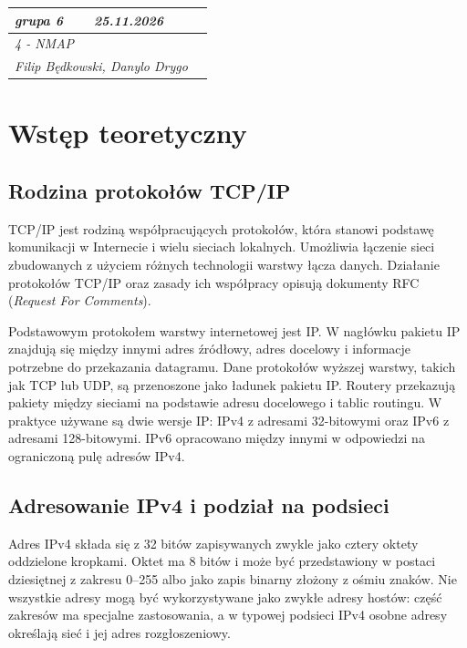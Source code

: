 \documentclass[11pt,a4paper]{article}
\begin{document}
\noindent
\begin{tabularx}{\textwidth}{|p{}|X|p{}|}
\hline
\textit{grupa 6} & \textit{25.11.2026} & \textit{} \\[1.2em]
\hline
\multicolumn{3}{|l|}{\textit{4 - NMAP}} \\[1.2em]
\hline
\multicolumn{2}{|l|}{\textit{Filip Będkowski, Danylo Drygo}} & \textit{} \\[1.2em]
\hline
\end{tabularx}

\vspace{1em}

\section*{Wstęp teoretyczny}

\subsection*{Rodzina protokołów TCP/IP}

TCP/IP jest rodziną współpracujących protokołów, która stanowi podstawę
komunikacji w Internecie i wielu sieciach lokalnych. Umożliwia łączenie sieci
zbudowanych z użyciem różnych technologii warstwy łącza danych. Działanie
protokołów TCP/IP oraz zasady ich współpracy opisują dokumenty RFC
(\textit{Request For Comments}).

Podstawowym protokołem warstwy internetowej jest IP. W nagłówku pakietu IP
znajdują się między innymi adres źródłowy, adres docelowy i informacje
potrzebne do przekazania datagramu. Dane protokołów wyższej warstwy, takich
jak TCP lub UDP, są przenoszone jako ładunek pakietu IP. Routery przekazują
pakiety między sieciami na podstawie adresu docelowego i tablic routingu.
W praktyce używane są dwie wersje IP: IPv4 z adresami 32-bitowymi oraz IPv6
z adresami 128-bitowymi. IPv6 opracowano między innymi w odpowiedzi na
ograniczoną pulę adresów IPv4.

\subsection*{Adresowanie IPv4 i podział na podsieci}

Adres IPv4 składa się z 32 bitów zapisywanych zwykle jako cztery oktety
oddzielone kropkami. Oktet ma 8 bitów i może być przedstawiony w postaci
dziesiętnej z zakresu 0--255 albo jako zapis binarny złożony z ośmiu znaków.
Nie wszystkie adresy mogą być wykorzystywane jako zwykłe adresy hostów:
część zakresów ma specjalne zastosowania, a w typowej podsieci IPv4 osobne
adresy określają sieć i jej adres rozgłoszeniowy.
\end{document}
